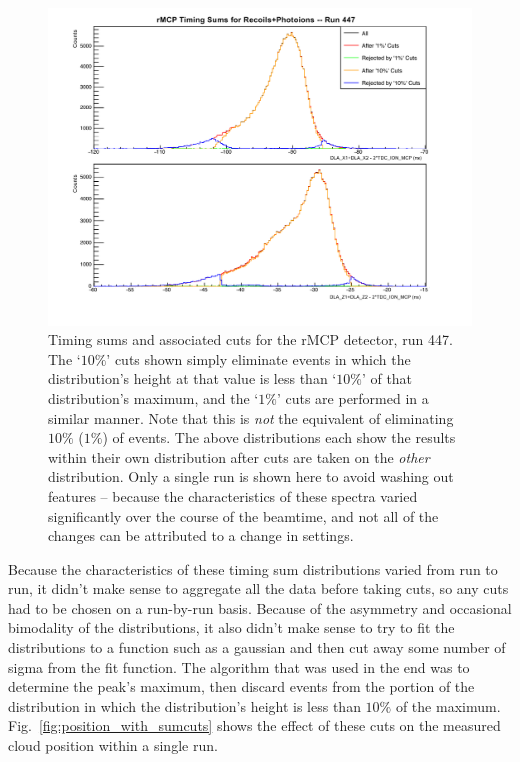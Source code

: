 \begin{figure}[h!tb]
	\centering
	\includegraphics[width=.999\linewidth]
	{Figures/rMCP_sumcuts_447.pdf}
	\caption[Timing sums for the rMCP, run 447.]{Timing sums and associated cuts for the rMCP detector, run 447.  The `$10\%$' cuts shown simply eliminate events in which the distribution's height at that value is less than `$10\%$' of that distribution's maximum, and the `$1\%$' cuts are performed in a similar manner.  Note that this is \emph{not} the equivalent of eliminating $10\%$ ($1\%$) of events. The above distributions each show the results within their own distribution after cuts are taken on the \emph{other} distribution.  Only a single run is shown here to avoid washing out features -- because the characteristics of these spectra varied significantly over the course of the beamtime, and not all of the changes can be attributed to a change in settings.
	}	
	\label{fig:sumcuts}
\end{figure}

Because the characteristics of these timing sum distributions varied from run to run, it didn't make sense to aggregate all the data before taking cuts, so any cuts had to be chosen on a run-by-run basis.  Because of the asymmetry and occasional bimodality of the distributions, it also didn't make sense to try to fit the distributions to a function such as a gaussian and then cut away some number of sigma from the fit function.  The algorithm that was used in the end was to determine the peak's maximum, then discard events from the portion of the distribution in which the distribution's height is less than $10\%$ of the maximum.  Fig.~\ref{fig:position_with_sumcuts} shows the effect of these cuts on the measured cloud position within a single run.

